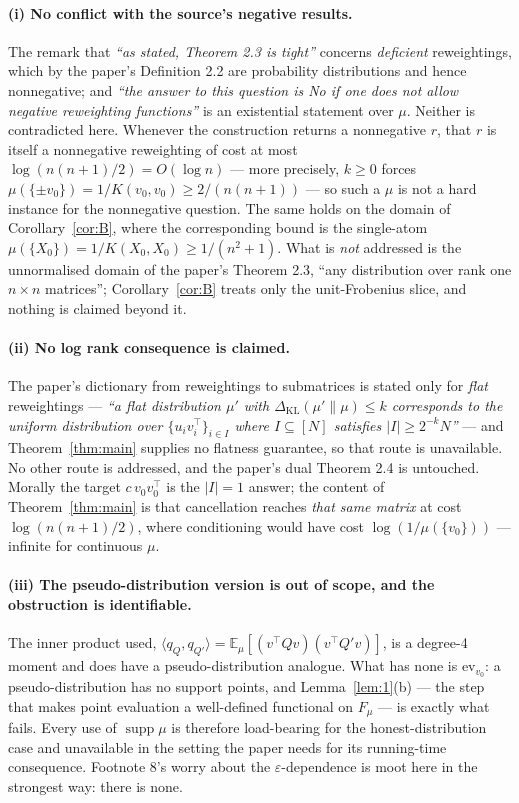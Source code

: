 \documentclass[11pt]{article}
\theoremstyle{remark}
\newcommand{\Ex}{\mathbb{E}}
\newcommand{\Fm}{F_\mu}
\newcommand{\supp}{\operatorname{supp}}
\newcommand{\ev}{\mathrm{ev}}
\begin{document}
\paragraph{(i) No conflict with the source's negative results.} The remark that
\emph{``as stated, Theorem 2.3 is tight''} concerns \emph{deficient} reweightings, which by the
paper's Definition 2.2 are probability distributions and hence nonnegative; and \emph{``the
answer to this question is No if one does not allow negative reweighting functions''} is an
existential statement over $\mu$. Neither is contradicted here. Whenever the construction
returns a nonnegative $r$, that $r$ is itself a nonnegative reweighting of cost at most
$\log(n(n+1)/2)=O(\log n)$ --- more precisely, $k\geq 0$ forces
$\mu(\{\pm v_0\})=1/K(v_0,v_0)\geq 2/(n(n+1))$ --- so such a $\mu$ is not a hard instance for
the nonnegative question. The same holds on the domain of
Corollary~\ref{cor:B}, where the corresponding bound is the single-atom
$\mu(\{X_0\})=1/K(X_0,X_0)\geq 1/(n^2+1)$. What is \emph{not} addressed is the unnormalised
domain of the paper's Theorem 2.3, ``any distribution over rank one $n\times n$ matrices'';
Corollary~\ref{cor:B} treats only the unit-Frobenius slice, and nothing is claimed beyond it.

\paragraph{(ii) No log rank consequence is claimed.} The paper's dictionary from reweightings
to submatrices is stated only for \emph{flat} reweightings --- \emph{``a flat distribution
$\mu'$ with $\Delta_{\mathrm{KL}}(\mu'\|\mu)\leqslant k$ corresponds to the uniform distribution
over $\{u_iv_i^{\top}\}_{i\in I}$ where $I\subseteq[N]$ satisfies $|I|\geqslant 2^{-k}N$''} ---
and Theorem~\ref{thm:main} supplies no flatness guarantee, so that route is unavailable. No
other route is addressed, and the paper's dual Theorem 2.4 is untouched. Morally the target
$c\,v_0v_0^{\top}$ is the $|I|=1$ answer; the content of Theorem~\ref{thm:main} is that
cancellation reaches \emph{that same matrix} at cost $\log(n(n+1)/2)$, where conditioning would
have cost $\log(1/\mu(\{v_0\}))$ --- infinite for continuous $\mu$.

\paragraph{(iii) The pseudo-distribution version is out of scope, and the obstruction is
identifiable.} The inner product used, $\langle q_Q,q_{Q'}\rangle=\Ex_\mu[(v^{\top}Qv)(v^{\top}Q'v)]$,
is a degree-4 moment and does have a pseudo-distribution analogue. What has none is $\ev_{v_0}$:
a pseudo-distribution has no support points, and Lemma~\ref{lem:1}(b) --- the step that makes
point evaluation a well-defined functional on $\Fm$ --- is exactly what fails. Every use of
$\supp\mu$ is therefore load-bearing for the honest-distribution case and unavailable in the
setting the paper needs for its running-time consequence. Footnote 8's worry about the
$\varepsilon$-dependence is moot here in the strongest way: there is none.
\end{document}
